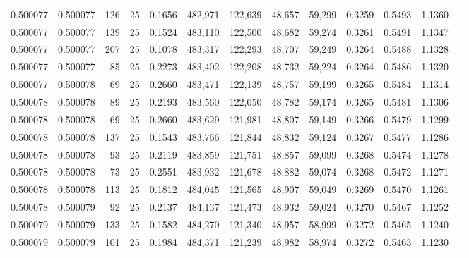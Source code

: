 \begin{tabular}{rrrrrrrrrrrrr}
0.500077 & 0.500077 &   126 &  25 &                                     0.1656 & 482,971 & 122,639 &  48,657 &  59,299 & 0.3259 & 0.5493 & 1.1360 \\
0.500077 & 0.500077 &   139 &  25 &                                     0.1524 & 483,110 & 122,500 &  48,682 &  59,274 & 0.3261 & 0.5491 & 1.1347 \\
0.500077 & 0.500077 &   207 &  25 &                                     0.1078 & 483,317 & 122,293 &  48,707 &  59,249 & 0.3264 & 0.5488 & 1.1328 \\
0.500077 & 0.500077 &    85 &  25 &                                     0.2273 & 483,402 & 122,208 &  48,732 &  59,224 & 0.3264 & 0.5486 & 1.1320 \\
0.500077 & 0.500078 &    69 &  25 &                                     0.2660 & 483,471 & 122,139 &  48,757 &  59,199 & 0.3265 & 0.5484 & 1.1314 \\
0.500078 & 0.500078 &    89 &  25 &                                     0.2193 & 483,560 & 122,050 &  48,782 &  59,174 & 0.3265 & 0.5481 & 1.1306 \\
0.500078 & 0.500078 &    69 &  25 &                                     0.2660 & 483,629 & 121,981 &  48,807 &  59,149 & 0.3266 & 0.5479 & 1.1299 \\
0.500078 & 0.500078 &   137 &  25 &                                     0.1543 & 483,766 & 121,844 &  48,832 &  59,124 & 0.3267 & 0.5477 & 1.1286 \\
0.500078 & 0.500078 &    93 &  25 &                                     0.2119 & 483,859 & 121,751 &  48,857 &  59,099 & 0.3268 & 0.5474 & 1.1278 \\
0.500078 & 0.500078 &    73 &  25 &                                     0.2551 & 483,932 & 121,678 &  48,882 &  59,074 & 0.3268 & 0.5472 & 1.1271 \\
0.500078 & 0.500078 &   113 &  25 &                                     0.1812 & 484,045 & 121,565 &  48,907 &  59,049 & 0.3269 & 0.5470 & 1.1261 \\
0.500078 & 0.500079 &    92 &  25 &                                     0.2137 & 484,137 & 121,473 &  48,932 &  59,024 & 0.3270 & 0.5467 & 1.1252 \\
0.500079 & 0.500079 &   133 &  25 &                                     0.1582 & 484,270 & 121,340 &  48,957 &  58,999 & 0.3272 & 0.5465 & 1.1240 \\
0.500079 & 0.500079 &   101 &  25 &                                     0.1984 & 484,371 & 121,239 &  48,982 &  58,974 & 0.3272 & 0.5463 & 1.1230 \\

\end{tabular}
